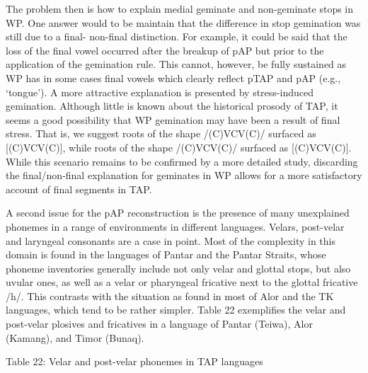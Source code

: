 \documentclass[a4paper]{article}
\begin{document}
The problem then is how to explain medial geminate and non-geminate stops in WP. One answer would to be maintain that the difference in stop gemination was still due to a final- non-final distinction. For example, it could be said that the loss of the final vowel occurred after the breakup of pAP but prior to the application of the gemination rule. This cannot, however, be fully sustained as WP has in some cases final vowels which clearly reflect pTAP and pAP (e.g., {\textquoteleft}tongue{\textquoteright}). A more attractive explanation is presented by stress-induced gemination. Although little is known about the historical prosody of TAP, it seems a good possibility that WP gemination may have been a result of final stress. That is, we suggest roots of the shape /(C)V{\textprimstress}CV(C)/ surfaced as [(C)V{\textprimstress}C{\textlengthmark}V(C)], while roots of the shape /{\textprimstress}(C)VCV(C)/ surfaced as [{\textprimstress}(C)VCV(C)]. While this scenario remains to be confirmed by a more detailed study, discarding the final/non-final explanation for geminates in WP allows for a more satisfactory account of final segments in TAP.

A second issue for the pAP reconstruction is the presence of many unexplained phonemes in a range of environments in different languages. Velars, post-velar and laryngeal consonants are a case in point. Most of the complexity in this domain is found in the languages of Pantar and the Pantar Straits, whose phoneme inventories generally include not only velar and glottal stops, but also uvular ones, as well as a velar or pharyngeal fricative next to the glottal fricative /h/. This contrasts with the situation as found in most of Alor and the TK languages, which tend to be rather simpler. Table 22 exemplifies the velar and post-velar plosives and fricatives in a language of Pantar (Teiwa), Alor (Kamang), and Timor (Bunaq).

{\centering
Table 22: Velar and post-velar phonemes in TAP languages
\par}
\end{document}
